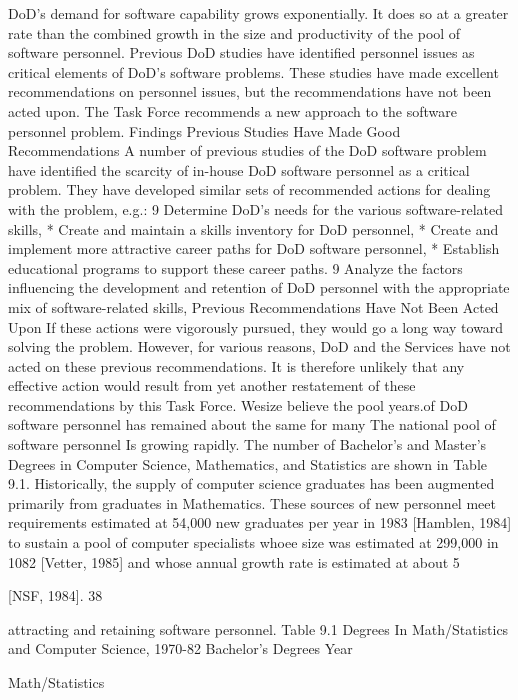 \documentclass[12pt]{article}
\begin{document}
DoD's demand for software capability grows exponentially. It does so at a greater rate
than the combined growth in the size and productivity of the pool of software personnel.
Previous DoD studies have identified personnel issues as critical elements of DoD's
software problems. These studies have made excellent recommendations on personnel
issues, but the recommendations have not been acted upon.
The Task Force recommends a new approach to the software personnel problem.
Findings
Previous Studies Have Made Good Recommendations
A number of previous studies of the DoD software problem have identified the scarcity
of in-house DoD software personnel as a critical problem. They have developed similar
sets of recommended actions for dealing with the problem, e.g.:
9 Determine DoD's needs for the various software-related skills,
* Create and maintain a skills inventory for DoD personnel,
* Create and implement more attractive career paths for DoD software personnel,
* Establish educational programs to support these career paths.
9 Analyze the factors influencing the development and retention of DoD personnel
with the appropriate mix of software-related skills,
Previous Recommendations Have Not Been Acted Upon
If these actions were vigorously pursued, they would go a long way toward solving the
problem.
However, for various reasons, DoD and the Services have not acted on these previous
recommendations. It is therefore unlikely that any effective action would result from yet
another restatement of these recommendations by this Task Force.
Wesize
believe
the pool
years.of DoD software personnel has remained about the
same
for many
The national pool of software personnel Is growing rapidly.
The number of Bachelor's and Master's Degrees in Computer Science, Mathematics,
and Statistics are shown in Table 9.1. Historically, the supply of computer science
graduates has been augmented primarily from graduates in Mathematics. These sources
of new personnel meet requirements estimated at 54,000 new graduates per year in 1983
[Hamblen, 1984] to sustain a pool of computer specialists whoee size was estimated at
299,000 in 1082 [Vetter, 1985] and whose annual growth rate is estimated at about 5%

[NSF, 1984].
38

attracting and retaining software personnel.
Table 9.1
Degrees In Math/Statistics and Computer Science, 1970-82
Bachelor's Degrees
Year

Math/Statistics
\end{document}
